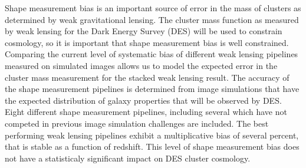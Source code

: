 	Shape measurement bias is an important source of error in the 
mass of clusters as determined by weak gravitational lensing. The
cluster mass function as measured by weak lensing for the Dark Energy Survey (DES)
will be used to constrain cosmology, so it is important that shape measurement
bias is well constrained. Comparing the current level of systematic bias of different 
weak lensing pipelines measured on simulated images allows us to model the expected error
in the cluster mass measurement for the stacked weak lensing result.
     The accuracy of the shape measurement pipelines is determined from image simulations
that have the expected distribution of galaxy properties that will be observed by DES. Eight 
different shape measurement pipelines, including several which have not competed in previous
image simulation challenges are included. 
      The best performing weak lensing pipelines exhibit a multiplicative bias of several percent, 
that is stable as a function of redshift. This level of shape measurement bias does not have a statisticaly
significant impact on DES cluster cosmology.